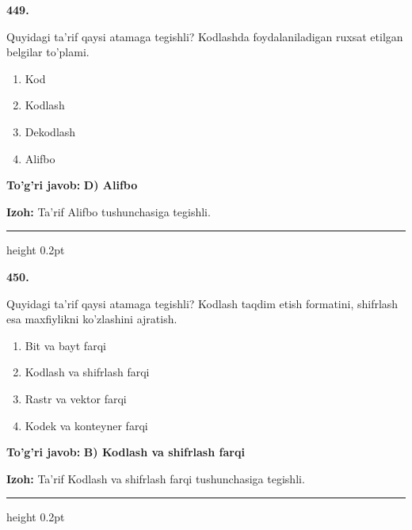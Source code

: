 \documentclass[10pt,a4paper,oneside]{article}
\begin{document}
\noindent\textbf{\color{ink}449.}
\par
Quyidagi ta'rif qaysi atamaga tegishli? Kodlashda foydalaniladigan ruxsat etilgan belgilar to'plami.
\begin{enumerate}[label=\Alph*),leftmargin=9mm]
\item Kod
\item Kodlash
\item Dekodlash
\item Alifbo
\end{enumerate}
\begin{tcolorbox}[enhanced,breakable,colback=teal!4,colframe=teal!50!black,boxrule=0.5pt,arc=1.1mm,left=3mm,right=3mm,top=1.7mm,bottom=1.7mm,before skip=2mm,after skip=2mm]
\textbf{\color{teal}To'g'ri javob:} \textbf{D) Alifbo}
\par\smallskip
\textbf{Izoh:} Ta'rif Alifbo tushunchasiga tegishli.
\end{tcolorbox}
\vspace{2mm}\hrule height 0.2pt \vspace{3mm}

\noindent\textbf{\color{ink}450.}
\par
Quyidagi ta'rif qaysi atamaga tegishli? Kodlash taqdim etish formatini, shifrlash esa maxfiylikni ko'zlashini ajratish.
\begin{enumerate}[label=\Alph*),leftmargin=9mm]
\item Bit va bayt farqi
\item Kodlash va shifrlash farqi
\item Rastr va vektor farqi
\item Kodek va konteyner farqi
\end{enumerate}
\begin{tcolorbox}[enhanced,breakable,colback=teal!4,colframe=teal!50!black,boxrule=0.5pt,arc=1.1mm,left=3mm,right=3mm,top=1.7mm,bottom=1.7mm,before skip=2mm,after skip=2mm]
\textbf{\color{teal}To'g'ri javob:} \textbf{B) Kodlash va shifrlash farqi}
\par\smallskip
\textbf{Izoh:} Ta'rif Kodlash va shifrlash farqi tushunchasiga tegishli.
\end{tcolorbox}
\vspace{2mm}\hrule height 0.2pt \vspace{3mm}
\end{document}
